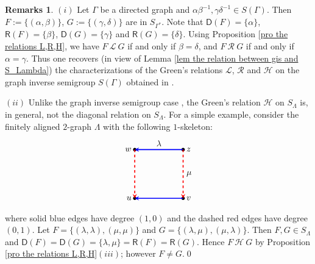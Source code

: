 \documentclass[a4paper,reqno,11pt]{amsart}
\numberwithin{equation}{section}
\theoremstyle{definition}
\newtheorem{rmks}[thm]{Remarks}
\theoremstyle{remark}
\begin{document}
\begin{rmks}\label{rem recovering L,R of graph inverse semigroups}
$(i)$ Let $\Gamma$ be a directed graph and $\alpha\beta^{-1},\gamma\delta^{-1}\in S(\Gamma)$. Then $F:=\{(\alpha,\beta)\}$, $G:=\{(\gamma,\delta)\}$ are in $S_{\Gamma^*}$. Note that $\mathsf{D}(F)=\{\alpha\}$, $\mathsf{R}(F)=\{\beta\}$, $\mathsf{D}(G)=\{\gamma\}$ and $\mathsf{R}(G)=\{\delta\}$. Using Proposition \ref{pro the relations L,R,H}, we have $F~\mathscr{L}~G$ if and only if $\beta=\delta$, and $F~\mathscr{R}~G$ if and only if $\alpha=\gamma$. Thus one recovers (in view of Lemma \ref{lem the relation between gis and S_Lambda}) the characterizations of the Green's relations $\mathscr{L}$, $\mathscr{R}$ and $\mathscr{H}$ on the graph inverse semigroup $S(\Gamma)$ obtained in \cite[Corollary 2]{Mesyan}. 

$(ii)$ Unlike the graph inverse semigroup case \cite[Corollary 2(4)]{Mesyan}, the Green's relation $\mathscr{H}$ on $S_\Lambda$ is, in general, not the diagonal relation on $S_\Lambda$. For a simple example, consider the finitely aligned $2$-graph $\Lambda$ with the following $1$-skeleton:
\[
\begin{tikzpicture}[>=stealth, line width=1.2pt]

    \fill (0,0) circle (2pt);
    \fill (2,0) circle (2pt);
    \fill (0,-2) circle (2pt);
    \fill (2,-2) circle (2pt);

    \draw[->, blue] (2,0) -- (0,0)
        node[midway, above] {\textcolor{black}{$\lambda$}};

    \draw[->, blue] (2,-2) -- (0,-2);

    \draw[->, dashed, red, line width=1.2pt]
        (0,0) -- (0,-2);
        
    \draw[->, dashed, red, line width=1.2pt]
        (2,0) -- (2,-2)
        node[midway, right] {\textcolor{black}{$\mu$}};

    \node[left] at (0,0) {$w$};
    \node[right] at (2,0) {$z$};
    \node[left] at (0,-2) {$u$};
    \node[right] at (2,-2) {$v$};

\end{tikzpicture}
\]
where solid blue edges have degree $(1,0)$ and the dashed red edges have degree $(0,1)$. Let $F=\{(\lambda,\lambda),(\mu,\mu)\}$ and $G=\{(\lambda,\mu),(\mu,\lambda)\}$. Then $F,G\in S_\Lambda$ and $\mathsf{D}(F)=\mathsf{D}(G)=\{\lambda,\mu\}=\mathsf{R}(F)=\mathsf{R}(G)$. Hence $F~\mathscr{H}~G$ by Proposition \ref{pro the relations L,R,H}$(iii)$; however $F\neq G$.\qed 
\end{rmks}
\end{document}
